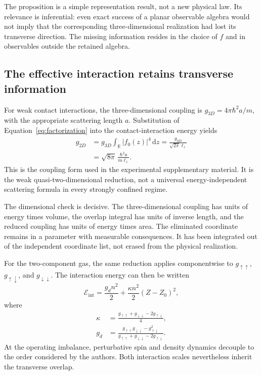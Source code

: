 \documentclass[11pt,a4paper]{article}
\theoremstyle{definition}
\theoremstyle{remark}
\newcommand{\dd}{\mathrm{d}}
\newcommand{\R}{\mathbb{R}}
\newcommand{\lop}{\ell_z}
\begin{document}
The proposition is a simple representation result, not a new physical law. Its relevance is inferential: even exact success of a planar observable algebra would not imply that the corresponding three-dimensional realization had lost its transverse direction. The missing information resides in the choice of $f$ and in observables outside the retained algebra.

\subsection{The effective interaction retains transverse information}
For weak contact interactions, the three-dimensional coupling is $g_{3D}=4\pi\hbar^2a/m$, with the appropriate scattering length $a$. Substitution of Equation~\eqref{eq:factorization} into the contact-interaction energy yields
\begin{align}
 g_{2D}&=g_{3D}\int_{\R}|f_0(z)|^4\,\dd z
       =\frac{g_{3D}}{\sqrt{2\pi}\lop}\nonumber\\
       &=\sqrt{8\pi}\,\frac{\hbar^2a}{m\lop}.
 \label{eq:g2d}
\end{align}
This is the coupling form used in the experimental supplementary material. It is the weak quasi-two-dimensional reduction, not a universal energy-independent scattering formula in every strongly confined regime.\cite{zhang2026,hadzibabic,petrov}

The dimensional check is decisive. The three-dimensional coupling has units of energy times volume, the overlap integral has units of inverse length, and the reduced coupling has units of energy times area. The eliminated coordinate remains in a parameter with measurable consequences. It has been integrated out of the independent coordinate list, not erased from the physical realization.

For the two-component gas, the same reduction applies componentwise to $g_{\uparrow\uparrow}$, $g_{\uparrow\downarrow}$, and $g_{\downarrow\downarrow}$. The interaction energy can then be written
\begin{equation}
 \mathcal E_{\mathrm{int}}
 =\frac{g_dn^2}{2}+\frac{\kappa n^2}{2}(Z-Z_0)^2,
 \label{eq:interaction}
\end{equation}
where
\begin{align}
 \kappa&=\frac{g_{\uparrow\uparrow}+g_{\downarrow\downarrow}
                   -2g_{\uparrow\downarrow}}{4},\nonumber\\
 g_d&=\frac{g_{\uparrow\uparrow}g_{\downarrow\downarrow}
                   -g_{\uparrow\downarrow}^2}
                  {g_{\uparrow\uparrow}+g_{\downarrow\downarrow}
                   -2g_{\uparrow\downarrow}}.
 \label{eq:kappa}
\end{align}
At the operating imbalance, perturbative spin and density dynamics decouple to the order considered by the authors. Both interaction scales nevertheless inherit the transverse overlap.\cite{zhang2026}
\end{document}
